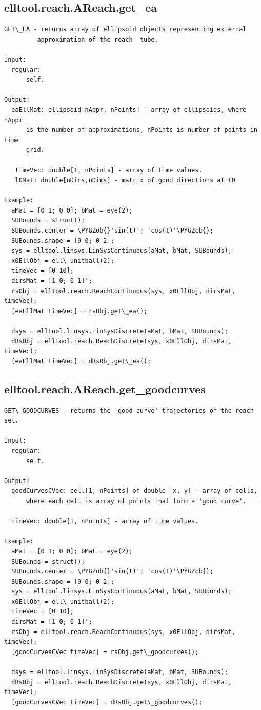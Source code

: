 \documentclass[letterpaper,10pt,english]{sphinxmanual}
\def\PYGZob{\char`\{}
\def\PYGZcb{\char`\}}
\begin{document}
\subsection{elltool.reach.AReach.get\_ea}
\label{chap_functions:elltool-reach-areach-get-ea}
\begin{Verbatim}[commandchars=\\\{\}]
GET\_EA - returns array of ellipsoid objects representing external
         approximation of the reach  tube.

Input:
  regular:
      self.

Output:
  eaEllMat: ellipsoid[nAppr, nPoints] - array of ellipsoids, where nAppr
      is the number of approximations, nPoints is number of points in time
      grid.

   timeVec: double[1, nPoints] - array of time values.
   l0Mat: double[nDirs,nDims] - matrix of good directions at t0

Example:
  aMat = [0 1; 0 0]; bMat = eye(2);
  SUBounds = struct();
  SUBounds.center = \PYGZob{}'sin(t)'; 'cos(t)'\PYGZcb{};
  SUBounds.shape = [9 0; 0 2];
  sys = elltool.linsys.LinSysContinuous(aMat, bMat, SUBounds);
  x0EllObj = ell\_unitball(2);
  timeVec = [0 10];
  dirsMat = [1 0; 0 1]';
  rsObj = elltool.reach.ReachContinuous(sys, x0EllObj, dirsMat, timeVec);
  [eaEllMat timeVec] = rsObj.get\_ea();

  dsys = elltool.linsys.LinSysDiscrete(aMat, bMat, SUBounds);
  dRsObj = elltool.reach.ReachDiscrete(sys, x0EllObj, dirsMat, timeVec);
  [eaEllMat timeVec] = dRsObj.get\_ea();
\end{Verbatim}


\subsection{elltool.reach.AReach.get\_goodcurves}
\label{chap_functions:elltool-reach-areach-get-goodcurves}
\begin{Verbatim}[commandchars=\\\{\}]
GET\_GOODCURVES - returns the 'good curve' trajectories of the reach set.

Input:
  regular:
      self.

Output:
  goodCurvesCVec: cell[1, nPoints] of double [x, y] - array of cells,
      where each cell is array of points that form a 'good curve'.

  timeVec: double[1, nPoints] - array of time values.

Example:
  aMat = [0 1; 0 0]; bMat = eye(2);
  SUBounds = struct();
  SUBounds.center = \PYGZob{}'sin(t)'; 'cos(t)'\PYGZcb{};
  SUBounds.shape = [9 0; 0 2];
  sys = elltool.linsys.LinSysContinuous(aMat, bMat, SUBounds);
  x0EllObj = ell\_unitball(2);
  timeVec = [0 10];
  dirsMat = [1 0; 0 1]';
  rsObj = elltool.reach.ReachContinuous(sys, x0EllObj, dirsMat, timeVec);
  [goodCurvesCVec timeVec] = rsObj.get\_goodcurves();

  dsys = elltool.linsys.LinSysDiscrete(aMat, bMat, SUBounds);
  dRsObj = elltool.reach.ReachDiscrete(sys, x0EllObj, dirsMat, timeVec);
  [goodCurvesCVec timeVec] = dRsObj.get\_goodcurves();
\end{Verbatim}
\end{document}
